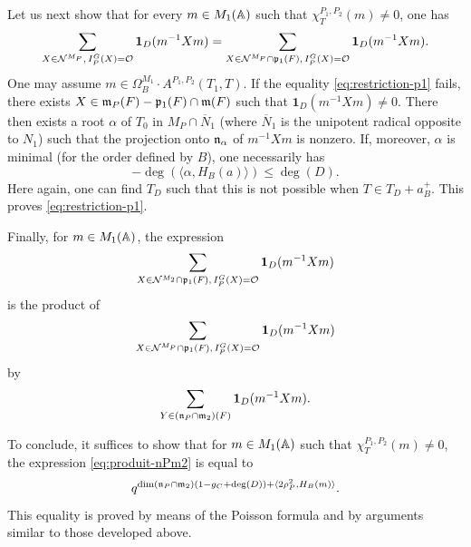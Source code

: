 \begin{paragr}
\begin{preuve}
Let us next show that for every $m\in M_1(\mathbb{A})$ such that $\chi_T^{P_1,P_2}(m)\neq 0$, one has
\begin{equation}
  \label{eq:restriction-p1}
  \sum_{X\in \mathcal{N}^{M_P},\, I_P^G(X)=\mathcal{O}} \mathbf{1}_D(m^{-1}Xm)=\sum_{X\in \mathcal{N}^{M_P}\cap \mathfrak{p}_1(F),\, I_P^G(X)=\mathcal{O}} \mathbf{1}_D(m^{-1}Xm).
\end{equation}
One may assume $m\in \Omega_B^{M_1}\cdot A^{P_1,P_2}(T_1,T)$. If the equality \eqref{eq:restriction-p1} fails, there exists $X\in \mathfrak{m}_P(F)-\mathfrak{p}_1(F)\cap \mathfrak{m}(F)$ such that $\mathbf{1}_D(m^{-1}Xm)\neq 0$. There then exists a root $\alpha$ of $T_0$ in $M_P\cap \overline{N}_1$ (where $\overline{N}_1$ is the unipotent radical \og opposite\fg{} to $N_1$) such that the projection onto $\mathfrak{n}_\alpha$ of $m^{-1}Xm$ is nonzero. If, moreover, $\alpha$ is minimal (for the order defined by $B$), one necessarily has
$$-\deg(\langle \alpha,H_B(a)\rangle)\leq \deg(D).$$
Here again, one can find $T_D$ such that this is not possible when $T\in T_D+a_B^+$. This proves \eqref{eq:restriction-p1}.

Finally, for $m\in M_1(\mathbb{A})$, the expression
$$\sum_{X\in \mathcal{N}^{M_2}\cap \mathfrak{p}_1(F),\, I_P^G(X)=\mathcal{O}} \mathbf{1}_D(m^{-1}Xm)$$
is the product of
$$\sum_{X\in \mathcal{N}^{M_P}\cap \mathfrak{p}_1(F),\, I_P^G(X)=\mathcal{O}} \mathbf{1}_D(m^{-1}Xm)$$
by
\begin{equation}
  \label{eq:produit-nPm2}
  \sum_{Y\in (\mathfrak{n}_P\cap \mathfrak{m}_2)(F)} \mathbf{1}_D(m^{-1}Xm).
\end{equation}

To conclude, it suffices to show that for $m\in M_1(\mathbb{A})$ such that $\chi_T^{P_1,P_2}(m)\neq 0$, the expression \eqref{eq:produit-nPm2} is equal to
$$q^{\dim(\mathfrak{n}_P\cap \mathfrak{m}_2)(1-g_C+\deg(D))+\langle 2\rho_P^2,H_B(m)\rangle}.$$
This equality is proved by means of the Poisson formula and by arguments similar to those developed above.
\end{preuve}
\end{paragr}

